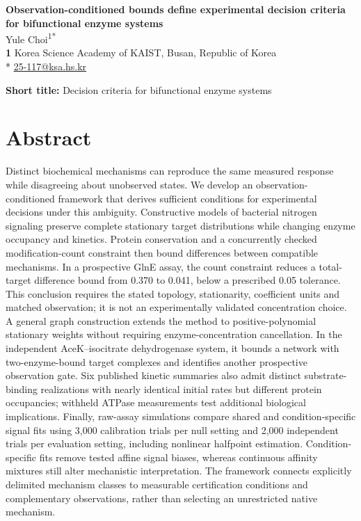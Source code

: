 \documentclass[10pt,letterpaper]{article}
\begin{document}
\linenumbers
\vspace*{0.2in}
\begin{flushleft}
{\Large\textbf{Observation-conditioned bounds define experimental decision criteria for bifunctional enzyme systems}}
\\
Yule Choi\textsuperscript{1*}
\\
\bigskip
\textbf{1} Korea Science Academy of KAIST, Busan, Republic of Korea
\\
\bigskip
* \href{mailto:25-117@ksa.hs.kr}{25-117@ksa.hs.kr}
\end{flushleft}
\noindent\textbf{Short title:} Decision criteria for bifunctional enzyme systems

\section*{Abstract}

Distinct biochemical mechanisms can reproduce the same measured response while disagreeing about unobserved states. We develop an observation-conditioned framework that derives sufficient conditions for experimental decisions under this ambiguity. Constructive models of bacterial nitrogen signaling preserve complete stationary target distributions while changing enzyme occupancy and kinetics. Protein conservation and a concurrently checked modification-count constraint then bound differences between compatible mechanisms. In a prospective GlnE assay, the count constraint reduces a total-target difference bound from 0.370 to 0.041, below a prescribed 0.05 tolerance. This conclusion requires the stated topology, stationarity, coefficient units and matched observation; it is not an experimentally validated concentration choice. A general graph construction extends the method to positive-polynomial stationary weights without requiring enzyme-concentration cancellation. In the independent AceK--isocitrate dehydrogenase system, it bounds a network with two-enzyme-bound target complexes and identifies another prospective observation gate. Six published kinetic summaries also admit distinct substrate-binding realizations with nearly identical initial rates but different protein occupancies; withheld ATPase measurements test additional biological implications. Finally, raw-assay simulations compare shared and condition-specific signal fits using 3,000 calibration trials per null setting and 2,000 independent trials per evaluation setting, including nonlinear halfpoint estimation. Condition-specific fits remove tested affine signal biases, whereas continuous affinity mixtures still alter mechanistic interpretation. The framework connects explicitly delimited mechanism classes to measurable certification conditions and complementary observations, rather than selecting an unrestricted native mechanism.
\end{document}
